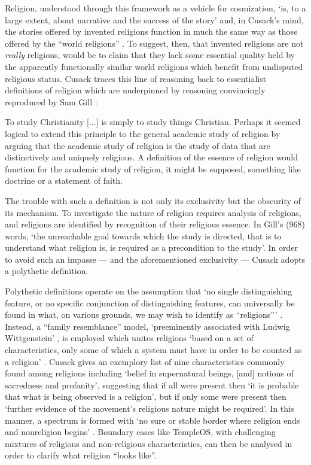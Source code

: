 \documentclass[Draft.tex]{subfiles}
\begin{document}
Religion, understood through this framework as a vehicle for cosmization,
`is, to a large extent, about narrative and the success of the story'
and, in Cusack's mind,
the stories offered by invented religions function in much the same way
as those offered by the ``world religions'' \parencite[4]{Cusack10}.
To suggest, then, that invented religions are not \textit{really} religions,
would be to claim that they lack some essential quality held by
the apparently functionally similar world religions
which benefit from undisputed religious status.
Cusack traces this line of reasoning back to essentialist definitions
of religion which are underpinned by reasoning convincingly
reproduced by Sam Gill \parencite*[968]{Gill94}:
\begin{displayquote}
  To study Christianity [...] is simply to study things Christian.
  Perhaps it seemed logical to extend this principle to the general
  academic study of religion by arguing that the academic study of religion
  is the study of data that are distinctively and uniquely religious.
  A definition of the essence of religion would function for the academic
  study of religion, it might be supposed, something like doctrine or a
  statement of faith.
\end{displayquote}
The trouble with such a definition is not only its exclusivity but the
obscurity of its mechanism.
To investigate the nature of religion requires analysis of religions,
and religions are identified by recognition of their religious essence.
In Gill's (968) words, `the unreachable goal towards which the study
is directed, that is to understand what religion is,
is required as a precondition to the study'.
In order to avoid such an impasse --- and the aforementioned exclusivity ---
Cusack adopts a polythetic definition.

Polythetic definitions operate on the assumption that
`no single distinguishing feature, or no specific conjunction
of distinguishing features, can universally be found in what,
on various grounds, we may wish to identify as ``religions''\thinspace'
\parencite[158]{Saler93}.
Instead, a ``family resemblance'' model, `preeminently associated with
Ludwig Wittgenstein' \parencite[159]{Saler93}, is employed which unites
religions `based on a set of characteristics, only some of which a system
must have in order to be counted as a religion' \parencite[158]{Wilson98}.
Cusack \parencite*[20]{Cusack10} gives an exemplory list
of nine characteristics commonly found among religions including
`belief in supernatural beings, [and] notions of sacredness and profanity',
suggesting that if all were present then `it is probable that what is being
observed is a religion', but if only some were present then `further
evidence of the movement's religious nature might be required'.
In this manner, a spectrum is formed with
`no sure or stable border where religion ends and
nonreligion begins' \parencite[396]{Saler99}.
Boundary cases like TempleOS, with challenging mixtures of
religious and non-religious characteristics, can then be analysed in order
to clarify what religion ``looks like''.
\end{document}
